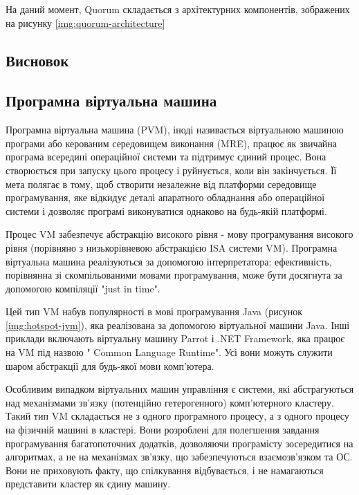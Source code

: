 \documentclass{lib/styles/default-style}
\begin{document}
    На даний момент, Quorum складається з архітектурних компонентів, зображених на рисунку \ref{img:quorum-architecture}



\subsection{Висновок}




\subsection{Програмна віртуальна машина}

    Програмна віртуальна машина (PVM), іноді називається віртуальною машиною програми
    або керованим середовищем виконання (MRE), 
    працює як звичайна програма всередині операційної системи та підтримує єдиний процес.
    Вона створюється при запуску цього процесу і руйнується, коли він закінчується.
    Її мета полягає в тому, щоб створити незалежне від платформи середовище програмування,
    яке відкидує деталі апаратного обладнання або операційної системи і
    дозволяє програмі виконуватися однаково на будь-якій платформі.

    Процес VM забезпечує абстракцію високого рівня
    - мову програмування високого рівня (порівняно з низькорівневою абстракцією ISA системи VM).
    Програмна віртуальна машина реалізуються за допомогою інтерпретатора;
    ефективність, порівнянна зі скомпільованими мовами програмування, може бути досягнута за допомогою компіляції "just in time".


    Цей тип VM набув популярності в мові програмування Java (рисунок \ref{img:hotspot-jvm}), яка реалізована за допомогою віртуальної машини Java.
    Інші приклади включають віртуальну машину Parrot і .NET Framework, яка працює на VM під назвою " Common Language Runtime".
    Усі вони можуть служити шаром абстракції для будь-якої мови комп'ютера.
    
    
    Особливим випадком віртуальних машин управління є системи,
    які абстрагуються над механізмами зв'язку (потенційно гетерогенного) комп'ютерного кластеру.
    Такий тип VM складається не з одного програмного процесу, а з одного процесу на фізичній машині в кластері.
    Вони розроблені для полегшення завдання програмування багатопоточних додатків, дозволяючи програмісту зосередитися на алгоритмах,
    а не на механізмах зв'язку, що забезпечуються взаємозв'язком та ОС.
    Вони не приховують факту, що спілкування відбувається, і не намагаються представити кластер як єдину машину.
\end{document}
